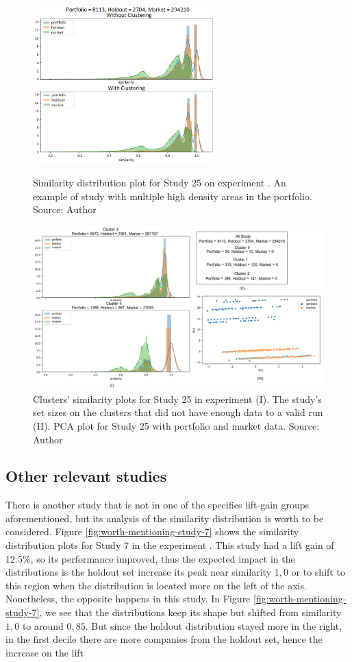 \begin{figure}[h]
   \centering
   \includegraphics[width=7cm]{fig/ch4-bump-study-25.png}
   \caption{Similarity distribution plot for Study 25 on experiment \nameExperimentII{}. An example of study with multiple high density areas in the portfolio. Source: Author}
   \label{fig:bump-study-25}

   \includegraphics[width=\linewidth]{fig/ch4-study-25-clusters-pca.png}
   \caption{Clusters' similarity plots for Study 25 in experiment \nameExperimentI{} (I). The study's set sizes on the clusters that did not have enough data to a valid run (II). PCA plot for Study 25 with portfolio and market data. Source: Author}
   \label{fig:study-25-clusters-pca}
\end{figure}

\subsection{Other relevant studies}
\label{ch:worth-ment}

There is another study that is not in one of the specifics lift-gain groups aforementioned, but its analysis of the similarity distribution is worth to be considered. Figure \ref{fig:worth-mentioning-study-7} shows the similarity distribution plots for Study 7 in the experiment \nameExperimentII{}. This study had a lift gain of $12.5\%$, so its performance improved, thus the expected impact in the distributions is the holdout set increase its peak near similarity $1,0$ or to shift to this region when the distribution is located more on the left of the axis. Nonetheless, the opposite happens in this study. In Figure \ref{fig:worth-mentioning-study-7}, we see that the distributions keep its shape but shifted from similarity $1,0$ to around $0,85$. But since the holdout distribution stayed more in the right, in the first decile there are more companies from the holdout set, hence the increase on the lift


